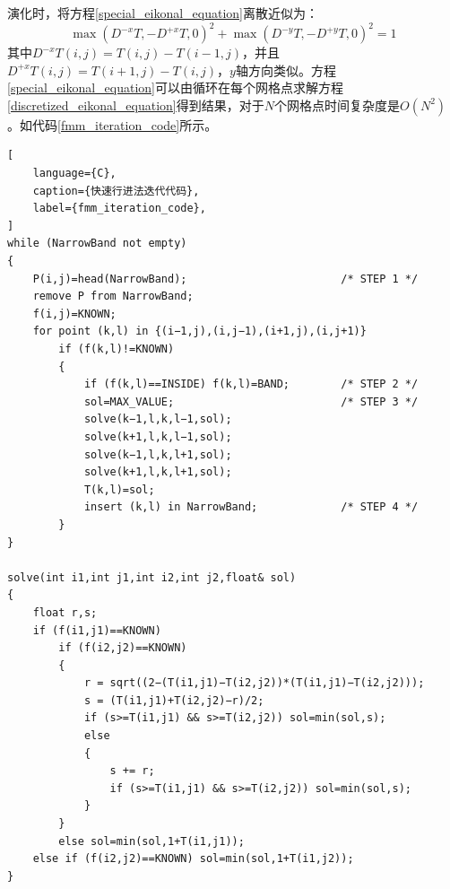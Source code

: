 演化时，将方程\ref{special_eikonal_equation}离散近似为：
\begin{equation}
    \label{discretized_eikonal_equation}
    \max(D^{-x}T, -D^{+x}T, 0)^2 + \max(D^{-y}T, -D^{+y}T, 0)^2 = 1
\end{equation}
其中$D^{-x}T(i, j) = T(i, j) - T(i - 1, j)$，并且$D^{+x}T(i, j) = T(i + 1, j) - T(i, j)$，$y$轴方向类似。方程\ref{special_eikonal_equation}可以由循环在每个网格点求解方程\ref{discretized_eikonal_equation}得到结果，对于$N$个网格点时间复杂度是$O(N^2)$。如代码\ref{fmm_iteration_code}所示。
\begin{lstlisting}[
    language={C},
    caption={快速行进法迭代代码},
    label={fmm_iteration_code},
]
while (NarrowBand not empty)
{
    P(i,j)=head(NarrowBand); 						/* STEP 1 */
    remove P from NarrowBand;
    f(i,j)=KNOWN;
    for point (k,l) in {(i−1,j),(i,j−1),(i+1,j),(i,j+1)}
        if (f(k,l)!=KNOWN)
        {
            if (f(k,l)==INSIDE) f(k,l)=BAND; 	    /* STEP 2 */
            sol=MAX_VALUE; 							/* STEP 3 */
            solve(k−1,l,k,l−1,sol);
            solve(k+1,l,k,l−1,sol);
            solve(k−1,l,k,l+1,sol);
            solve(k+1,l,k,l+1,sol);
            T(k,l)=sol;
            insert (k,l) in NarrowBand; 			/* STEP 4 */
        }
}

solve(int i1,int j1,int i2,int j2,float& sol)
{
    float r,s;
    if (f(i1,j1)==KNOWN)
        if (f(i2,j2)==KNOWN)
        {
            r = sqrt((2−(T(i1,j1)−T(i2,j2))*(T(i1,j1)−T(i2,j2)));
            s = (T(i1,j1)+T(i2,j2)−r)/2;
            if (s>=T(i1,j1) && s>=T(i2,j2)) sol=min(sol,s);
            else
            {
                s += r;
                if (s>=T(i1,j1) && s>=T(i2,j2)) sol=min(sol,s);
            }
        }
        else sol=min(sol,1+T(i1,j1));
    else if (f(i2,j2)==KNOWN) sol=min(sol,1+T(i1,j2));
}
\end{lstlisting}

